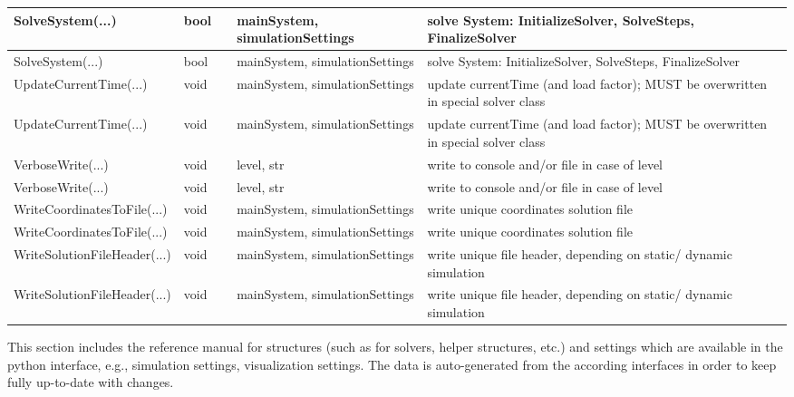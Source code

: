 \begin{center}
\begin{longtable}{| p{4.2cm} | p{2.5cm} | p{0.3cm} | p{3.0cm} | p{6cm} |}
    SolveSystem(...) &     bool &      &     mainSystem, simulationSettings &     solve System: InitializeSolver, SolveSteps, FinalizeSolver\\ \hline
    SolveSystem(...) &     bool &      &     mainSystem, simulationSettings &     solve System: InitializeSolver, SolveSteps, FinalizeSolver\\ \hline
    UpdateCurrentTime(...) &     void &      &     mainSystem, simulationSettings &     update currentTime (and load factor); MUST be overwritten in special solver class\\ \hline
    UpdateCurrentTime(...) &     void &      &     mainSystem, simulationSettings &     update currentTime (and load factor); MUST be overwritten in special solver class\\ \hline
    VerboseWrite(...) &     void &      &     level, str &     write to console and/or file in case of level\\ \hline
    VerboseWrite(...) &     void &      &     level, str &     write to console and/or file in case of level\\ \hline
    WriteCoordinatesToFile(...) &     void &      &     mainSystem, simulationSettings &     write unique coordinates solution file\\ \hline
    WriteCoordinatesToFile(...) &     void &      &     mainSystem, simulationSettings &     write unique coordinates solution file\\ \hline
    WriteSolutionFileHeader(...) &     void &      &     mainSystem, simulationSettings &     write unique file header, depending on static/ dynamic simulation\\ \hline
    WriteSolutionFileHeader(...) &     void &      &     mainSystem, simulationSettings &     write unique file header, depending on static/ dynamic simulation\\ \hline
	  \end{longtable}
	\end{center}

This section includes the reference manual for structures (such as for solvers, helper structures, etc.) 
and settings which are available in the python interface, e.g., simulation settings, visualization settings. 
The data is auto-generated from the according interfaces in order to keep fully up-to-date with changes.

